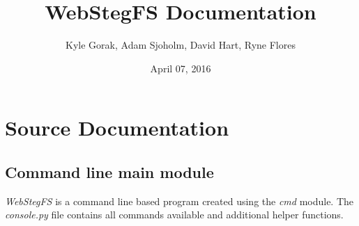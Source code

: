 \documentclass[letterpaper,12pt,openany,oneside]{sphinxmanual}
\title{WebStegFS Documentation}
\date{April 07, 2016}
\author{Kyle Gorak, Adam Sjoholm, David Hart, Ryne Flores}
\begin{document}
\maketitle
\tableofcontents
{}\label{index::doc}



\chapter{Source Documentation}
\label{index:source-documentation}

\section{Command line main module}
\label{console::doc}\label{console:command-line-main-module}\label{console:module-webStegFS.console}
\emph{WebStegFS} is a command line based program created using the \emph{cmd} module.
The \emph{console.py} file contains all commands available and additional helper
functions.
\end{document}
